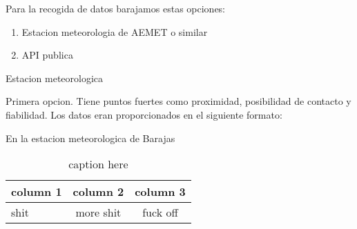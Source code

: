 Para la recogida de datos barajamos estas opciones:
\begin{enumerate}
    \item Estacion meteorologia de AEMET o similar
    \item API publica
\end{enumerate}

Estacion meteorologica

Primera opcion. Tiene puntos fuertes como proximidad, posibilidad de contacto y fiabilidad.
Los datos eran proporcionados en el siguiente formato:

En la estacion meteorologica de Barajas

\begin{table}[tb]
    \caption{caption here}
    \label{tab:tablename}
    \centering

    \begin{tabular}{l|cc}
    \hline

    \hline
    \textbf{column 1} & \textbf{column 2} & \textbf{column 3} \\
    \hline
        shit & more shit & fuck off\\
    \hline

    \hline
    \end{tabular}
\end{table}









